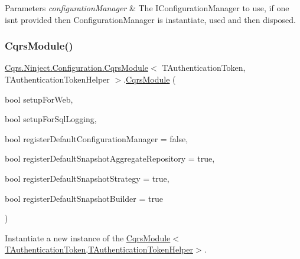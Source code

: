 \begin{DoxyParams}{Parameters}
{\em configuration\+Manager} & The I\+Configuration\+Manager to use, if one isn\textquotesingle{}t provided then Configuration\+Manager is instantiate, used and then disposed.\\
\hline
\end{DoxyParams}
\mbox{\label{classCqrs_1_1Ninject_1_1Configuration_1_1CqrsModule_ac17039525e66b01c67a7fb588e241345_ac17039525e66b01c67a7fb588e241345}} 
\subsubsection{\texorpdfstring{Cqrs\+Module()}{CqrsModule()}\hspace{0.1cm}{\footnotesize\ttfamily [2/2]}}
{\footnotesize\ttfamily \hyperlink{classCqrs_1_1Ninject_1_1Configuration_1_1CqrsModule}{Cqrs.\+Ninject.\+Configuration.\+Cqrs\+Module}$<$ T\+Authentication\+Token, T\+Authentication\+Token\+Helper $>$.\hyperlink{classCqrs_1_1Ninject_1_1Configuration_1_1CqrsModule}{Cqrs\+Module} (\begin{DoxyParamCaption}\item[{bool}]{setup\+For\+Web,  }\item[{bool}]{setup\+For\+Sql\+Logging,  }\item[{bool}]{register\+Default\+Configuration\+Manager = {\ttfamily false},  }\item[{bool}]{register\+Default\+Snapshot\+Aggregate\+Repository = {\ttfamily true},  }\item[{bool}]{register\+Default\+Snapshot\+Strategy = {\ttfamily true},  }\item[{bool}]{register\+Default\+Snapshot\+Builder = {\ttfamily true} }\end{DoxyParamCaption})}



Instantiate a new instance of the \hyperlink{classCqrs_1_1Ninject_1_1Configuration_1_1CqrsModule_a31a1047d3940842b760ad2a796aa1606_a31a1047d3940842b760ad2a796aa1606}{Cqrs\+Module$<$\+T\+Authentication\+Token,\+T\+Authentication\+Token\+Helper$>$}. 


